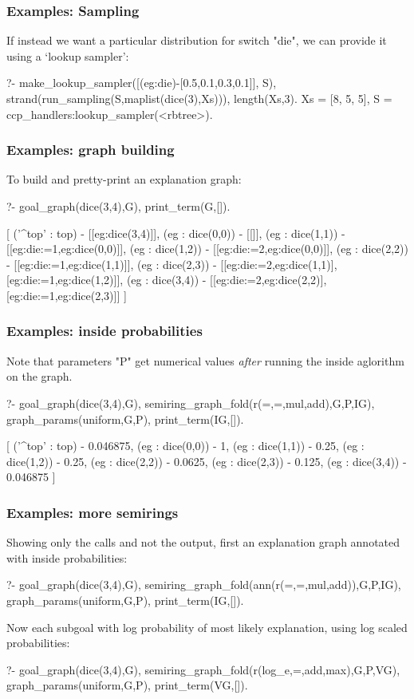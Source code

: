 \documentclass[usenames,dvipsnames]{beamer}
\newenvironment{isframe}[1][untitled]{\begin{frame}[fragile=singleslide,environment=isframe]\frametitle{#1}}{\end{frame}}
\begin{document}
\begin{isframe}[Examples: Sampling]
If instead we want a particular distribution for switch "die", we can provide it using
a `lookup sampler':
\begin{prolog-barred}
  ?- make_lookup_sampler([(eg:die)-[0.5,0.1,0.3,0.1]], S), 
     strand(run_sampling(S,maplist(dice(3),Xs))),
     length(Xs,3). 
  Xs = [8, 5, 5],
  S = ccp_handlers:lookup_sampler(<rbtree>).
\end{prolog-barred}
\end{isframe}

\begin{isframe}[Examples: graph building]
To build and pretty-print an explanation graph:
\begin{prolog-barred}
  ?- goal_graph(dice(3,4),G), print_term(G,[]).

  [ ('^top' : top) - [[eg:dice(3,4)]],
    (eg : dice(0,0)) - [[]],
    (eg : dice(1,1)) - [[eg:die:=1,eg:dice(0,0)]],
    (eg : dice(1,2)) - [[eg:die:=2,eg:dice(0,0)]],
    (eg : dice(2,2)) - [[eg:die:=1,eg:dice(1,1)]],
    (eg : dice(2,3)) - [[eg:die:=2,eg:dice(1,1)],
                        [eg:die:=1,eg:dice(1,2)]],
    (eg : dice(3,4)) - [[eg:die:=2,eg:dice(2,2)],
                        [eg:die:=1,eg:dice(2,3)]]
  ]
\end{prolog-barred}
\end{isframe}

\begin{isframe}[Examples: inside probabilities]
Note that parameters "P" get numerical values \emph{after}
running the inside aglorithm on the graph.
\begin{prolog-barred}
	?- goal_graph(dice(3,4),G), 
		 semiring_graph_fold(r(=,=,mul,add),G,P,IG), 
		 graph_params(uniform,G,P), 
		 print_term(IG,[]).

	[ ('^top' : top) - 0.046875,
		(eg : dice(0,0)) - 1,
		(eg : dice(1,1)) - 0.25,
		(eg : dice(1,2)) - 0.25,
		(eg : dice(2,2)) - 0.0625,
		(eg : dice(2,3)) - 0.125,
		(eg : dice(3,4)) - 0.046875
	]
\end{prolog-barred}
\end{isframe}

\begin{isframe}[Examples: more semirings]
Showing only the calls and not the output, first an explanation
graph annotated with inside probabilities:
\begin{prolog-barred}
	?- goal_graph(dice(3,4),G), 
		 semiring_graph_fold(ann(r(=,=,mul,add)),G,P,IG), 
		 graph_params(uniform,G,P), 
		 print_term(IG,[]).
\end{prolog-barred}
Now each subgoal with log probability of most likely explanation,
using log scaled probabilities:
\begin{prolog-barred}
  ?- goal_graph(dice(3,4),G), 
     semiring_graph_fold(r(log_e,=,add,max),G,P,VG), 
     graph_params(uniform,G,P), 
     print_term(VG,[]).
\end{prolog-barred}
\end{isframe}
\end{document}
